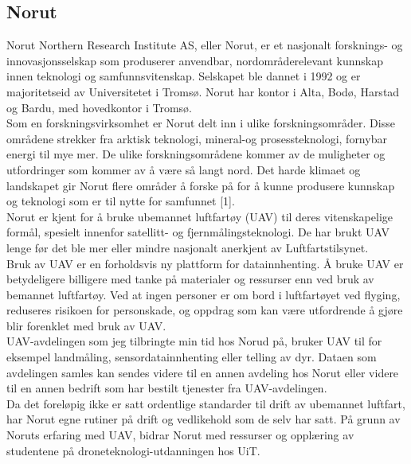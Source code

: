 \documentclass[12pt, a4paper]{article}
\begin{document}
\subsection{Norut}

Norut Northern Research Institute AS, eller Norut, er et nasjonalt forsknings- og innovasjonsselskap som produserer anvendbar, nordområderelevant kunnskap innen teknologi og samfunnsvitenskap. Selskapet ble dannet i 1992 og er majoritetseid av Universitetet i Tromsø. Norut har kontor i Alta, Bodø, Harstad og Bardu, med hovedkontor i Tromsø. \\

Som en forskningsvirksomhet er Norut delt inn i ulike forskningsområder. Disse områdene strekker fra arktisk teknologi, mineral-og prosessteknologi, fornybar energi til mye mer. De ulike forskningsområdene kommer av de muligheter og utfordringer som kommer av å være så langt nord. Det harde klimaet og landskapet gir Norut flere områder å forske på for å kunne produsere kunnskap og teknologi som er til nytte for samfunnet [1]. \\ 

Norut er kjent for å bruke ubemannet luftfartøy (UAV) til deres vitenskapelige formål, spesielt innenfor satellitt- og fjernmålingsteknologi. De har brukt UAV lenge før det ble mer eller mindre nasjonalt anerkjent av Luftfartstilsynet.\\

Bruk av UAV er en forholdsvis ny plattform for datainnhenting. Å bruke UAV er betydeligere billigere med tanke på materialer og ressurser enn ved bruk av bemannet luftfartøy. Ved at ingen personer er om bord i luftfartøyet ved flyging, reduseres risikoen for personskade, og oppdrag som kan være utfordrende å gjøre blir forenklet med bruk av UAV. \\

UAV-avdelingen som jeg tilbringte min tid hos Norud på, bruker UAV til for eksempel landmåling, sensordatainnhenting eller telling av dyr. Dataen som avdelingen samles kan sendes videre til en annen avdeling hos Norut eller videre til en annen bedrift som har bestilt tjenester fra UAV-avdelingen. \\

Da det foreløpig ikke er satt ordentlige standarder til drift av ubemannet luftfart, har Norut egne rutiner på drift og vedlikehold som de selv har satt. På grunn av Noruts erfaring med UAV, bidrar Norut med ressurser og opplæring av studentene på droneteknologi-utdanningen hos UiT. \\
\end{document}
